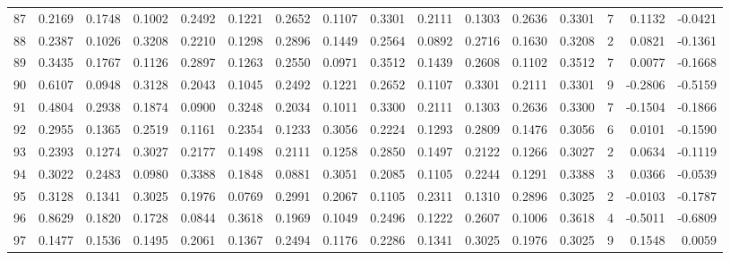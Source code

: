\begin{tabular}{lrrrrrrrrrrrrrrr}
87  &      0.2169 &  0.1748 &  0.1002 &  0.2492 &  0.1221 &  0.2652 &  0.1107 &  0.3301 &  0.2111 &  0.1303 &   0.2636 &     0.3301 &      7 &                    0.1132 &                    -0.0421 \\
88  &      0.2387 &  0.1026 &  0.3208 &  0.2210 &  0.1298 &  0.2896 &  0.1449 &  0.2564 &  0.0892 &  0.2716 &   0.1630 &     0.3208 &      2 &                    0.0821 &                    -0.1361 \\
89  &      0.3435 &  0.1767 &  0.1126 &  0.2897 &  0.1263 &  0.2550 &  0.0971 &  0.3512 &  0.1439 &  0.2608 &   0.1102 &     0.3512 &      7 &                    0.0077 &                    -0.1668 \\
90  &      0.6107 &  0.0948 &  0.3128 &  0.2043 &  0.1045 &  0.2492 &  0.1221 &  0.2652 &  0.1107 &  0.3301 &   0.2111 &     0.3301 &      9 &                   -0.2806 &                    -0.5159 \\
91  &      0.4804 &  0.2938 &  0.1874 &  0.0900 &  0.3248 &  0.2034 &  0.1011 &  0.3300 &  0.2111 &  0.1303 &   0.2636 &     0.3300 &      7 &                   -0.1504 &                    -0.1866 \\
92  &      0.2955 &  0.1365 &  0.2519 &  0.1161 &  0.2354 &  0.1233 &  0.3056 &  0.2224 &  0.1293 &  0.2809 &   0.1476 &     0.3056 &      6 &                    0.0101 &                    -0.1590 \\
93  &      0.2393 &  0.1274 &  0.3027 &  0.2177 &  0.1498 &  0.2111 &  0.1258 &  0.2850 &  0.1497 &  0.2122 &   0.1266 &     0.3027 &      2 &                    0.0634 &                    -0.1119 \\
94  &      0.3022 &  0.2483 &  0.0980 &  0.3388 &  0.1848 &  0.0881 &  0.3051 &  0.2085 &  0.1105 &  0.2244 &   0.1291 &     0.3388 &      3 &                    0.0366 &                    -0.0539 \\
95  &      0.3128 &  0.1341 &  0.3025 &  0.1976 &  0.0769 &  0.2991 &  0.2067 &  0.1105 &  0.2311 &  0.1310 &   0.2896 &     0.3025 &      2 &                   -0.0103 &                    -0.1787 \\
96  &      0.8629 &  0.1820 &  0.1728 &  0.0844 &  0.3618 &  0.1969 &  0.1049 &  0.2496 &  0.1222 &  0.2607 &   0.1006 &     0.3618 &      4 &                   -0.5011 &                    -0.6809 \\
97  &      0.1477 &  0.1536 &  0.1495 &  0.2061 &  0.1367 &  0.2494 &  0.1176 &  0.2286 &  0.1341 &  0.3025 &   0.1976 &     0.3025 &      9 &                    0.1548 &                     0.0059 \\

\end{tabular}
